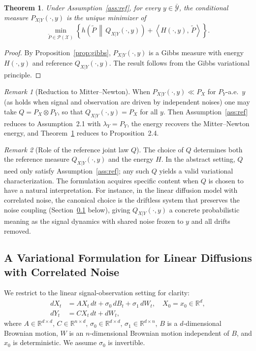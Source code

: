 \documentclass[12pt]{amsart}
\newtheorem{theorem}{Theorem}[section]
\theoremstyle{definition}
\theoremstyle{remark}
\newtheorem{remark}{Remark}
\begin{document}
\begin{theorem}\label{thm:var}
    Under Assumption~\ref{ass:ref}, for every $y \in \bar{\mathcal{Y}}$, the conditional measure $P_{X|Y}(\cdot, y)$ is the unique minimizer of
    \begin{equation}\label{eq:var}
        \min_{\tilde{P} \in \mathcal{P}(\mathcal{X})} \left\{ h\!\left(\tilde{P} \,\middle\|\, Q_{X|Y}(\cdot, y)\right) + \left\langle H(\cdot, y),\, \tilde{P} \right\rangle \right\}.
    \end{equation}
\end{theorem}

\begin{proof}
    By Proposition~\ref{prop:gibbs}, $P_{X|Y}(\cdot, y)$ is a Gibbs measure with energy $H(\cdot, y)$ and reference $Q_{X|Y}(\cdot, y)$. The result follows from the Gibbs variational principle.
\end{proof}

\begin{remark}[Reduction to Mitter--Newton]
    When $P_{X|Y}(\cdot, y) \ll P_X$ for $P_Y$-a.e.\ $y$ (as holds when signal and observation are driven by independent noises) one may take $Q = P_X \otimes P_Y$, so that $Q_{X|Y}(\cdot, y) = P_X$ for all $y$. Then Assumption~\ref{ass:ref} reduces to Assumption~2.1 with $\lambda_Y = P_Y$, the energy recovers the Mitter--Newton energy, and Theorem~\ref{thm:var} reduces to Proposition~2.4.
\end{remark}

\begin{remark}[Role of the reference joint law $Q$]
    The choice of $Q$ determines both the reference measure $Q_{X|Y}(\cdot, y)$ and the energy $H$. In the abstract setting, $Q$ need only satisfy Assumption~\ref{ass:ref}; any such $Q$ yields a valid variational characterization. The formulation acquires specific content when $Q$ is chosen to have a natural interpretation. For instance, in the linear diffusion model with correlated noise, the canonical choice is the driftless system that preserves the noise coupling (Section~\ref{sec:vfd} below), giving $Q_{X|Y}(\cdot, y)$ a concrete probabilistic meaning as the signal dynamics with shared noise frozen to $y$ and all drifts removed.
\end{remark}

\subsection{A Variational Formulation for Linear Diffusions with Correlated Noise}\label{sec:vfd}
We restrict to the linear signal-observation setting for clarity:
\begin{align*}
    dX_t &= AX_t \, dt + \sigma_0 \, dB_t + \sigma_1 \, dW_t, \quad X_0 = x_0 \in \mathbb{R}^d, \\
    dY_t &= CX_t \, dt + dW_t,
\end{align*}
where $A \in \mathbb{R}^{d \times d}$, $C \in \mathbb{R}^{n \times d}$, $\sigma_0 \in \mathbb{R}^{d \times d}$, $\sigma_1 \in \mathbb{R}^{d \times n}$, $B$ is a $d$-dimensional Brownian motion, $W$ is an $n$-dimensional Brownian motion independent of $B$, and $x_0$ is deterministic. We assume $\sigma_0$ is invertible.
\end{document}
